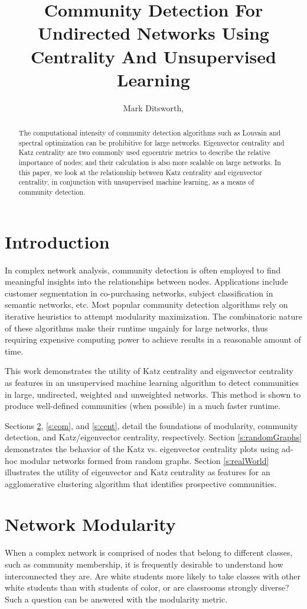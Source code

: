 \documentclass{IEEEtran}
\title{Community Detection For Undirected Networks Using Centrality And Unsupervised Learning}
\author{Mark Ditsworth, \textellipsis}
\begin{document}
	\maketitle
	\begin{abstract}
	The computational intensity of community detection algorithms such as Louvain and spectral optimization can be prohibitive for large networks.
	Eigenvector centrality and Katz centrality are two commonly used egocentric metrics to describe the relative importance of nodes; and their calculation is also more scalable on large networks.
	In this paper, we look at the relationship between Katz centrality and eigenvector centrality, in conjunction with unsupervised machine learning, as a means of community detection.
	\end{abstract}
	
	\section{Introduction}
	In complex network analysis, community detection is often employed to find meaningful insights into the relationships between nodes. 
	Applications include customer segmentation in co-purchasing networks, subject classification in semantic networks, etc. Most popular community detection algorithms rely on iterative heuristics to attempt modularity maximization. The combinatoric nature of these algorithms make their runtime ungainly for large networks, thus requiring expensive computing power to achieve results in a reasonable amount of time.
	
	This work demonstrates the utility of Katz centrality and eigenvector centrality as features in an unsupervised machine learning algorithm to detect communities in large, undirected, weighted and unweighted networks. This method is shown to produce well-defined communities (when possible) in a much faster runtime.
	
	Sections \ref{s:mod}, \ref{s:com}, and \ref{s:cent}, detail the foundations of modularity, community detection, and Katz/eigenvector centrality, respectively. Section \ref{s:randomGraphs} demonstrates the behavior of the Katz vs. eigenvector centrality plots using ad-hoc modular networks formed from random graphs. Section \ref{s:realWorld} illustrates the utility of eigenvector and Katz centrality as features for an agglomerative clustering algorithm  that identifies prospective communities.
	 
	\section{Network Modularity}
	\label{s:mod}
	When a complex network is comprised of nodes that belong to different classes, such as community membership, it is frequently desirable to understand how interconnected they are. Are white students more likely to take classes with other white students than with students of color, or are classrooms strongly diverse? Such a question can be answered with the modularity metric.
	
\end{document}
